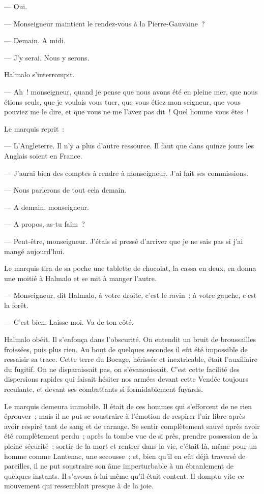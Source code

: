 \documentclass[french,twoside]{book} %
\begin{document}
— Oui.\par
— Monseigneur maintient le rendez-vous à la Pierre-Gauvaine ?\par
— Demain. A midi.\par
— J’y serai. Nous y serons.\par
Halmalo s’interrompit.\par
— Ah ! monseigneur, quand je pense que nous avons été en pleine mer, que nous étions seuls, que je voulais vous tuer, que vous étiez mon seigneur, que vous pouviez me le dire, et que vous ne me l’avez pas dit ! Quel homme vous êtes !\par
Le marquis reprit :\par
 — L’Angleterre. Il n’y a plus d’autre ressource. Il faut que dans quinze jours les Anglais soient en France.\par
— J’aurai bien des comptes à rendre à monseigneur. J’ai fait ses commissions.\par
— Nous parlerons de tout cela demain.\par
— A demain, monseigneur.\par
— A propos, as-tu faim ?\par
— Peut-être, monseigneur. J’étais si pressé d’arriver que je ne sais pas si j’ai mangé aujourd’hui.\par
Le marquis tira de sa poche une tablette de chocolat, la cassa en deux, en donna une moitié à Halmalo et se mit à manger l’autre.\par
— Monseigneur, dit Halmalo, à votre droite, c’est le ravin ; à votre gauche, c’est la forêt.\par
— C’est bien. Laisse-moi. Va de ton côté.\par
Halmalo obéit. Il s’enfonça dans l’obscurité. On entendit un bruit de broussailles froissées, puis plus rien. Au bout de quelques secondes il eût été impossible de ressaisir sa trace. Cette terre du Bocage, hérissée et inextricable, était l’auxiliaire du fugitif. On ne disparaissait pas, on s’évanouissait. C’est cette facilité des dispersions rapides qui faisait hésiter nos armées devant cette Vendée toujours reculante, et devant ses combattants si formidablement fuyards.\par
Le marquis demeura immobile. Il était de ces hommes qui s’efforcent de ne rien éprouver ; mais il ne put se soustraire à l’émotion de respirer l’air libre après avoir respiré tant de sang et de carnage. Se sentir complètement sauvé après avoir été complètement  perdu ; après la tombe vue de si près, prendre possession de la pleine sécurité ; sortir de la mort et rentrer dans la vie, c’était là, même pour un homme comme Lantenac, une secousse ; et, bien qu’il en eût déjà traversé de pareilles, il ne put soustraire son âme imperturbable à un ébranlement de quelques instants. Il s’avoua à lui-même qu’il était content. Il dompta vite ce mouvement qui ressemblait presque à de la joie.\par
\end{document}
